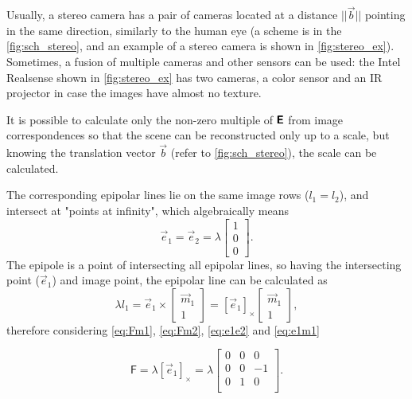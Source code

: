 Usually, a stereo camera has a pair of cameras located at a distance $||\vec{b}||$ pointing in the same direction, similarly to the human eye (a scheme is in the \autoref{fig:sch_stereo}, and an example of a stereo camera is shown in \autoref{fig:stereo_ex}). 
Sometimes, a fusion of multiple cameras and other sensors can be used: the Intel Realsense shown in \autoref{fig:stereo_ex} has two cameras, a color sensor and an IR projector in case the images have almost no texture.


It is possible to calculate only the non-zero multiple of $\pmb{\mathsf{E}}$ from image correspondences so that the scene can be reconstructed only up to a scale, but knowing the translation vector $\vec{b}$ (refer to \autoref{fig:sch_stereo}), the scale can be calculated.

The corresponding epipolar lines lie on the same image rows ($l_1 = l_2$), and intersect at "points at infinity", which algebraically means
\begin{equation}
    \label{eq:e1e2}
    \vec{e}_1 = \vec{e}_2 = \lambda \begin{bmatrix} 1 \\ 0 \\ 0 \end{bmatrix}.
\end{equation}
The epipole is a point of intersecting all epipolar lines, so having the intersecting point ($\vec{e}_1$) and image point, the epipolar line can be calculated as
\begin{equation}
    \label{eq:e1m1}
    \lambda l_1 = \vec{e}_1 \times \begin{bmatrix}
        \vec{m}_1 \\ 1
    \end{bmatrix} = [\vec{e}_1]_\times \begin{bmatrix} \vec{m}_1 \\ 1\end{bmatrix},
\end{equation}
therefore considering \eqref{eq:Fm1}, \eqref{eq:Fm2}, \eqref{eq:e1e2} and \eqref{eq:e1m1} 

\begin{equation}
    \label{eq:F_simple}
    \pmb{\mathsf{F}} = \lambda [\vec{e}_1]_\times = \lambda \begin{bmatrix}
        0 & 0 & 0 \\
        0 & 0 & -1 \\
        0 & 1 & 0 \\
    \end{bmatrix}.
\end{equation}

